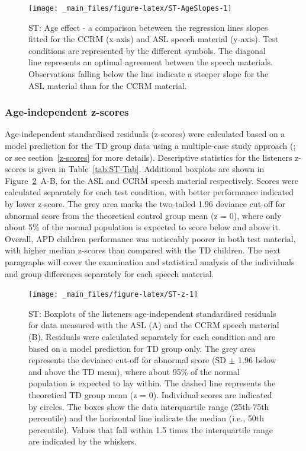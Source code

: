 \documentclass[a4paper, twoside]{templates/ociamthesis}
\begin{document}
\begin{figure}

{\centering \texttt{[image: \_main\_files/figure-latex/ST-AgeSlopes-1]} 

}

\caption{ST: Age effect - a comparison beteween the regression lines slopes fitted for the CCRM (x-axis) and ASL speech material (y-axis). Test conditions are represented by the different symbols. The diagonal line represents an optimal agreement between the speech materials. Observations falling below the line indicate a steeper slope for the ASL material than for the CCRM material.}\label{fig:ST-AgeSlopes}
\end{figure}

\hypertarget{age-independent-z-scores}{%
\subsubsection*{Age-independent z-scores}\label{age-independent-z-scores}}

Age-independent standardised residuals (z-scores) were calculated based on a model prediction for the TD group data using a multiple-case study approach (\textcite{Ramus2003}; or see section~\ref{z-scores} for more details). Descriptive statistics for the listeners z-scores is given in Table~\ref{tab:ST-Tab}. Additional boxplots are shown in Figure~\ref{fig:ST-z}~A-B, for the ASL and CCRM speech material respectively. Scores were calculated separately for each test condition, with better performance indicated by lower z-score. The grey area marks the two-tailed 1.96 deviance cut-off for abnormal score from the theoretical control group mean (z = 0), where only about 5\% of the normal population is expected to score below and above it. Overall, APD children performance was noticeably poorer in both test material, with higher median z-scores than compared with the TD children. The next paragraphs will cover the examination and statistical analysis of the individuals and group differences separately for each speech material.\\

\begin{figure}

{\centering \texttt{[image: \_main\_files/figure-latex/ST-z-1]} 

}

\caption{ST: Boxplots of the listeners age-independent standardised residuals for data measured with the ASL (A) and the CCRM speech material (B). Residuals were calculated separately for each condition and are based on a model prediction for TD group only. The grey area represents the deviance cut-off for abnormal score (SD $\pm$ 1.96 below and above the TD mean), where about 95\% of the normal population is expected to lay within. The dashed line represents the theoretical TD group mean (z = 0). Individual scores are indicated by circles. The boxes show the data interquartile range (25th-75th percentile) and the horizontal line indicate the median (i.e., 50th percentile). Values that fall within 1.5 times the interquartile range are indicated by the whiskers.}\label{fig:ST-z}
\end{figure}
\end{document}
